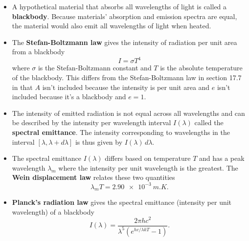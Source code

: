 \documentclass{article}
\begin{document}
\begin{itemize}
  \item A hypothetical material that absorbs all wavelengths of light is called a \textbf{blackbody}. Because materials' absorption and emission spectra are equal, the material would also emit all wavelengths of light when heated.

  \item The \textbf{Stefan-Boltzmann law} gives the intensity of radiation per unit area from a blackbody \[I = \sigma T^4\] where $\sigma$ is the Stefan-Boltzmann constant and $T$ is the absolute temperature of the blackbody. This differs from the Stefan-Boltzmann law in section 17.7 in that $A$ isn't included because the intensity is per unit area and $e$ isn't included because it's a blackbody and $e = 1$.

  \item The intensity of emitted radiation is not equal across all wavelengths and can be described by the intensity per wavelength interval $I(\lambda)$ called the \textbf{spectral emittance}. The intensity corresponding to wavelengths in the interval $[\lambda, \lambda + d \lambda]$ is thus given by $I(\lambda) \,d\lambda$.

  \item The spectral emittance $I(\lambda)$ differs based on temperature $T$ and has a peak wavelength $\lambda_m$ where the intensity per unit wavelength is the greatest. The \textbf{Wein displacement law} relates these two quantities \[\lambda_m T = \qty{2.90e-3}{m.K}.\]

  \item \textbf{Planck's radiation law} gives the spectral emittance (intensity per unit wavelength) of a blackbody \[I(\lambda) = \frac{2 \pi h c^2}{\lambda^5 (e^{h c / \lambda k T} - 1)}.\]
\end{itemize}
\end{document}
